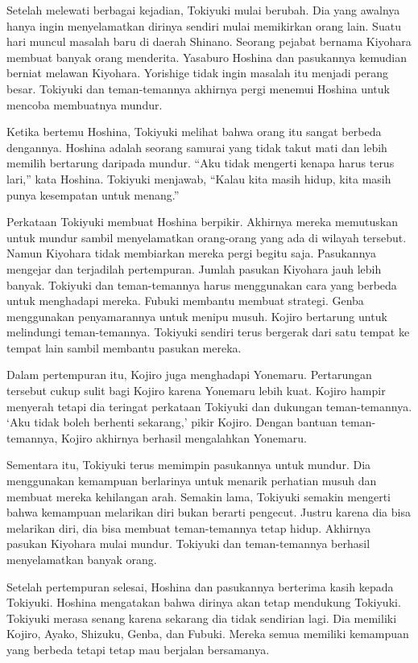 Setelah melewati berbagai kejadian, Tokiyuki mulai berubah. Dia yang awalnya hanya ingin menyelamatkan dirinya sendiri mulai memikirkan orang lain. Suatu hari muncul masalah baru di daerah Shinano. Seorang pejabat bernama Kiyohara membuat banyak orang menderita. Yasaburo Hoshina dan pasukannya kemudian berniat melawan Kiyohara. Yorishige tidak ingin masalah itu menjadi perang besar. Tokiyuki dan teman-temannya akhirnya pergi menemui Hoshina untuk mencoba membuatnya mundur.

Ketika bertemu Hoshina, Tokiyuki melihat bahwa orang itu sangat berbeda dengannya. Hoshina adalah seorang samurai yang tidak takut mati dan lebih memilih bertarung daripada mundur.
``Aku tidak mengerti kenapa harus terus lari,'' kata Hoshina.
Tokiyuki menjawab, ``Kalau kita masih hidup, kita masih punya kesempatan untuk menang.''

Perkataan Tokiyuki membuat Hoshina berpikir. Akhirnya mereka memutuskan untuk mundur sambil menyelamatkan orang-orang yang ada di wilayah tersebut. Namun Kiyohara tidak membiarkan mereka pergi begitu saja. Pasukannya mengejar dan terjadilah pertempuran. Jumlah pasukan Kiyohara jauh lebih banyak. Tokiyuki dan teman-temannya harus menggunakan cara yang berbeda untuk menghadapi mereka. Fubuki membantu membuat strategi. Genba menggunakan penyamarannya untuk menipu musuh. Kojiro bertarung untuk melindungi teman-temannya. Tokiyuki sendiri terus bergerak dari satu tempat ke tempat lain sambil membantu pasukan mereka.

Dalam pertempuran itu, Kojiro juga menghadapi Yonemaru. Pertarungan tersebut cukup sulit bagi Kojiro karena Yonemaru lebih kuat. Kojiro hampir menyerah tetapi dia teringat perkataan Tokiyuki dan dukungan teman-temannya.
`Aku tidak boleh berhenti sekarang,' pikir Kojiro.
Dengan bantuan teman-temannya, Kojiro akhirnya berhasil mengalahkan Yonemaru.

Sementara itu, Tokiyuki terus memimpin pasukannya untuk mundur. Dia menggunakan kemampuan berlarinya untuk menarik perhatian musuh dan membuat mereka kehilangan arah. Semakin lama, Tokiyuki semakin mengerti bahwa kemampuan melarikan diri bukan berarti pengecut. Justru karena dia bisa melarikan diri, dia bisa membuat teman-temannya tetap hidup. Akhirnya pasukan Kiyohara mulai mundur. Tokiyuki dan teman-temannya berhasil menyelamatkan banyak orang.

Setelah pertempuran selesai, Hoshina dan pasukannya berterima kasih kepada Tokiyuki. Hoshina mengatakan bahwa dirinya akan tetap mendukung Tokiyuki. Tokiyuki merasa senang karena sekarang dia tidak sendirian lagi. Dia memiliki Kojiro, Ayako, Shizuku, Genba, dan Fubuki. Mereka semua memiliki kemampuan yang berbeda tetapi tetap mau berjalan bersamanya.


